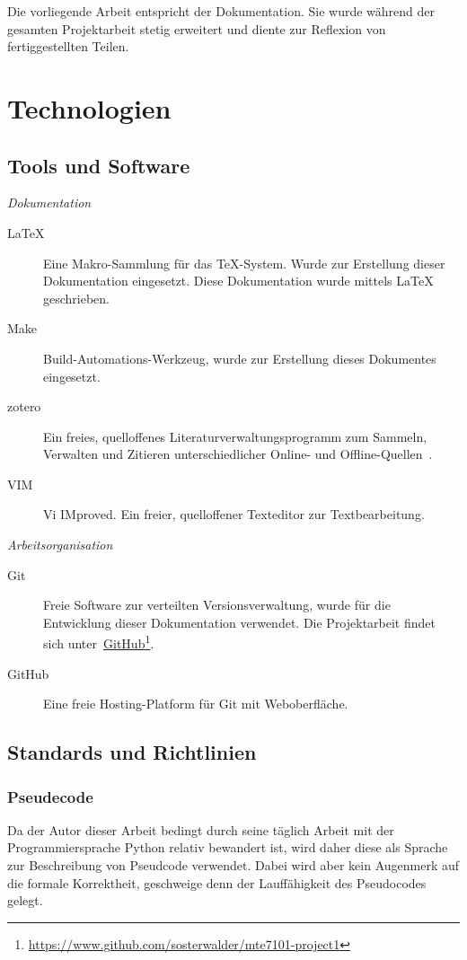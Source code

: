 Die vorliegende Arbeit entspricht der Dokumentation. Sie wurde während der gesamten Projektarbeit stetig erweitert und diente zur Reflexion von fertiggestellten Teilen.

\section{Technologien}
\label{sec:technologies}

\subsection{Tools und Software}
\label{subsec:tools_software}

\noindent\emph{Dokumentation}
\begin{description}
    \item[\LaTeX] Eine Makro-Sammlung für das \TeX-System. Wurde zur Erstellung
        dieser Dokumentation eingesetzt. Diese Dokumentation wurde mittels \LaTeX{} geschrieben.
    \item[Make] Build-Automations-Werkzeug, wurde zur Erstellung dieses Dokumentes eingesetzt.
    \item[zotero] Ein freies, quelloffenes Literaturverwaltungsprogramm zum Sammeln, Verwalten und Zitieren unterschiedlicher Online- und Offline-Quellen~\cite{wikipedia_foundation_zotero_2015}.
    \item[VIM] Vi IMproved. Ein freier, quelloffener Texteditor zur Textbearbeitung.
\end{description}

\noindent\emph{Arbeitsorganisation}
\begin{description}
    \item[Git] Freie Software zur verteilten Versionsverwaltung, wurde für die
        Entwicklung dieser Dokumentation verwendet. Die Projektarbeit findet sich
        unter~\href{https://www.github.com/sosterwalder/mte7101-project1}{GitHub}\footnote{\href{https://www.github.com/sosterwalder/mte7101-project1}{https://www.github.com/sosterwalder/mte7101-project1}}.
    \item[GitHub] Eine freie Hosting-Platform für Git mit Weboberfläche.
\end{description}

\subsection{Standards und Richtlinien}
\label{subsec:standards_guidelines}

\subsubsection{Pseudecode}
\label{ssubsec:standards_guidelines:psuedocode}

Da der Autor dieser Arbeit bedingt durch seine täglich Arbeit mit der Programmiersprache Python relativ bewandert ist, wird daher diese als Sprache zur Beschreibung von Pseudcode verwendet.
Dabei wird aber kein Augenmerk auf die formale Korrektheit, geschweige denn der Lauffähigkeit des Pseudocodes gelegt.

